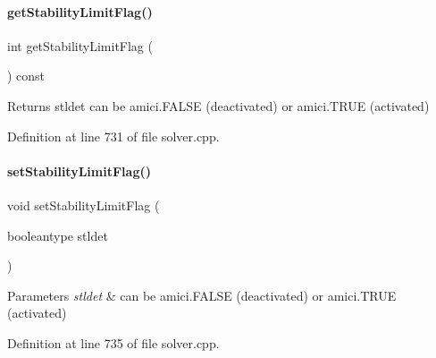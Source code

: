 \paragraph{\texorpdfstring{get\+Stability\+Limit\+Flag()}{getStabilityLimitFlag()}}
{\footnotesize\ttfamily int get\+Stability\+Limit\+Flag (\begin{DoxyParamCaption}{ }\end{DoxyParamCaption}) const}

\begin{DoxyReturn}{Returns}
stldet can be amici.\+F\+A\+L\+SE (deactivated) or amici.\+T\+R\+UE (activated) 
\end{DoxyReturn}


Definition at line 731 of file solver.\+cpp.

\mbox{\label{classamici_1_1_solver_a618a94f1d84f9c71230d476f9a0205ce}} 
\paragraph{\texorpdfstring{set\+Stability\+Limit\+Flag()}{setStabilityLimitFlag()}}
{\footnotesize\ttfamily void set\+Stability\+Limit\+Flag (\begin{DoxyParamCaption}\item[{booleantype}]{stldet }\end{DoxyParamCaption})}


\begin{DoxyParams}{Parameters}
{\em stldet} & can be amici.\+F\+A\+L\+SE (deactivated) or amici.\+T\+R\+UE (activated) \\
\hline
\end{DoxyParams}


Definition at line 735 of file solver.\+cpp.

